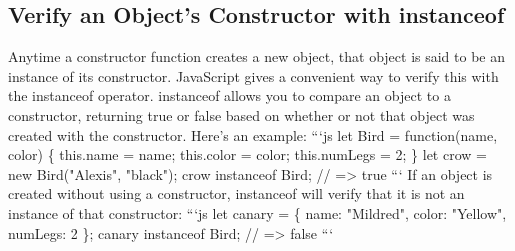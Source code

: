 \documentclass{article}%
\begin{document}
%
\subsection{Verify an Object's Constructor with instanceof}%
\label{subsec:VerifyanObjectsConstructorwithinstanceof}%
Anytime a constructor function creates a new object, that object is said to be an instance of its constructor. JavaScript gives a convenient way to verify this with the instanceof operator. instanceof allows you to compare an object to a constructor, returning true or false based on whether or not that object was created with the constructor. Here's an example:\newline%
```js\newline%
let Bird = function(name, color) \{\newline%
  this.name = name;\newline%
  this.color = color;\newline%
  this.numLegs = 2;\newline%
\}\newline%
let crow = new Bird("Alexis", "black");\newline%
crow instanceof Bird; // => true\newline%
```\newline%
If an object is created without using a constructor, instanceof will verify that it is not an instance of that constructor:\newline%
```js\newline%
let canary = \{\newline%
  name: "Mildred",\newline%
  color: "Yellow",\newline%
  numLegs: 2\newline%
\};\newline%
canary instanceof Bird; // => false\newline%
```\newline%

%
\end{document}

